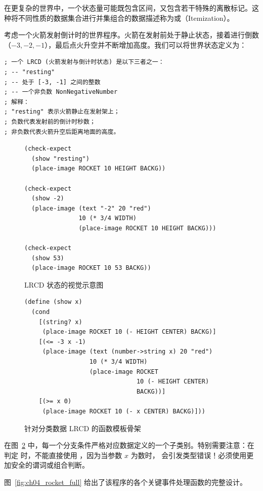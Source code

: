 在更复杂的世界中，一个状态量可能既包含区间，又包含若干特殊的离散标记。这种将不同性质的数据集合进行并集组合的数据描述称为或（Itemization）。

考虑一个火箭发射倒计时的世界程序。火箭在发射前处于静止状态，接着进行倒数（$-3, -2, -1$），最后点火升空并不断增加高度。我们可以将世界状态定义为：

\begin{lstlisting}[language=BSL]
; 一个 LRCD (火箭发射与倒计时状态) 是以下三者之一：
; -- "resting"
; -- 处于 [-3, -1] 之间的整数
; -- 一个非负数 NonNegativeNumber
; 解释：
; "resting" 表示火箭静止在发射架上；
; 负数代表发射前的倒计时秒数；
; 非负数代表火箭升空后距离地面的高度。
\end{lstlisting}

\begin{figure}[htbp]
  \centering
\begin{lstlisting}[language=BSL]
(check-expect
  (show "resting")
  (place-image ROCKET 10 HEIGHT BACKG))

(check-expect
  (show -2)
  (place-image (text "-2" 20 "red")
               10 (* 3/4 WIDTH)
               (place-image ROCKET 10 HEIGHT BACKG)))

(check-expect
  (show 53)
  (place-image ROCKET 10 53 BACKG))
\end{lstlisting}
  \caption{LRCD 状态的视觉示意图}
  \label{fig:lrcd_scenes}
\end{figure}

\begin{figure}[htbp]
  \centering
\begin{lstlisting}[language=BSL]
(define (show x)
  (cond
    [(string? x)
     (place-image ROCKET 10 (- HEIGHT CENTER) BACKG)]
    [(<= -3 x -1)
     (place-image (text (number->string x) 20 "red")
                  10 (* 3/4 WIDTH)
                  (place-image ROCKET
                               10 (- HEIGHT CENTER)
                               BACKG))]
    [(>= x 0)
     (place-image ROCKET 10 (- x CENTER) BACKG)]))
\end{lstlisting}
  \caption{针对分类数据 LRCD 的函数模板骨架}
  \label{fig:lrcd_template}
\end{figure}

在图~\ref{fig:lrcd_template} 中，每一个分支条件严格对应数据定义的一个子类别。特别需要注意：在判定  时，不能直接使用 ，因为当参数 $x$ 为数时， 会引发类型错误！必须使用更加安全的谓词或组合判断。

图~\ref{fig:ch04_rocket_full} 给出了该程序的各个关键事件处理函数的完整设计。

